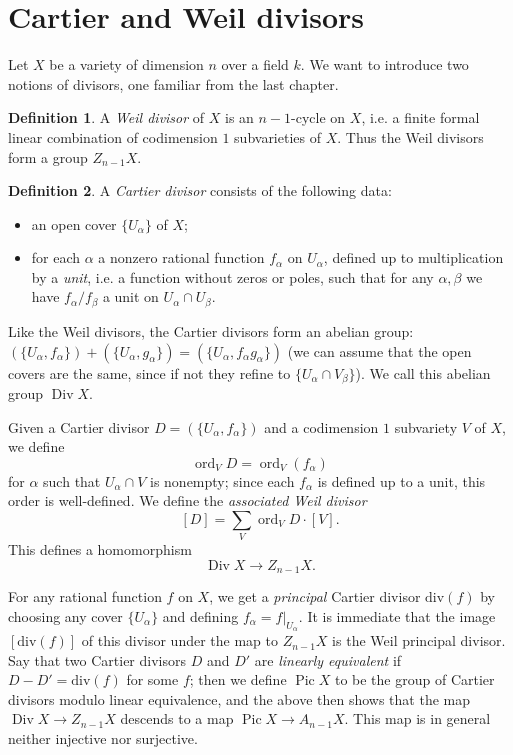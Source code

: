 \documentclass[12pt]{article}
\theoremstyle{definition}
\newtheorem{defn}{Definition}[section]
\theoremstyle{theorem}
\newcommand{\1}{\mathbbm 1}
\renewcommand{\div}{\text{div}}
\DeclareMathOperator{\Div}{Div}
\DeclareMathOperator{\Pic}{Pic}
\DeclareMathOperator{\ord}{ord}
\begin{document}
\section{Cartier and Weil divisors}
Let $X$ be a variety of dimension $n$ over a field $k$. We want to introduce two notions of divisors, one familiar from the last chapter.

\begin{defn}
A {\em Weil divisor} of $X$ is an $n-1$-cycle on $X$, i.e. a finite formal linear combination of codimension $1$ subvarieties of $X$. Thus the Weil divisors form a group $Z_{n-1} X$.
\end{defn}

\begin{defn}
A {\em Cartier divisor} consists of the following data:
\begin{itemize}
\item an open cover $\{U_\alpha\}$ of $X$;
\item for each $\alpha$ a nonzero rational function $f_\alpha$ on $U_\alpha$, defined up to multiplication by a {\em unit}, i.e. a function without zeros or poles, such that for any $\alpha, \beta$ we have $f_\alpha/f_\beta$ a unit on $U_\alpha \cap U_\beta$.
\end{itemize}
\end{defn}

Like the Weil divisors, the Cartier divisors form an abelian group: $(\{U_\alpha, f_\alpha\}) + (\{U_\alpha, g_\alpha\}) = (\{U_\alpha, f_\alpha g_\alpha\})$ (we can assume that the open covers are the same, since if not they refine to $\{U_\alpha \cap V_\beta\}$). We call this abelian group $\Div X$.

Given a Cartier divisor $D = (\{U_\alpha, f_\alpha\})$ and a codimension $1$ subvariety $V$ of $X$, we define \[ \ord_V D = \ord_V (f_\alpha) \] for $\alpha$ such that $U_\alpha \cap V$ is nonempty; since each $f_\alpha$ is defined up to a unit, this order is well-defined. We define the {\em associated Weil divisor} \[ [D] = \sum_V \ord_V D \cdot [V] . \] This defines a homomorphism \[ \Div X \to Z_{n-1} X. \]

For any rational function $f$ on $X$, we get a {\em principal} Cartier divisor $\div(f)$ by choosing any cover $\{U_\alpha\}$ and defining $f_\alpha = f|_{U_\alpha}$. It is immediate that the image $[\div(f)]$ of this divisor under the map to $Z_{n-1}X$ is the Weil principal divisor. Say that two Cartier divisors $D$ and $D'$ are {\em linearly equivalent} if $D - D' = \div(f)$ for some $f$; then we define $\Pic X$ to be the group of Cartier divisors modulo linear equivalence, and the above then shows that the map $\Div X \to Z_{n-1} X$ descends to a map $\Pic X \to A_{n-1} X$. This map is in general neither injective nor surjective.
\end{document}
